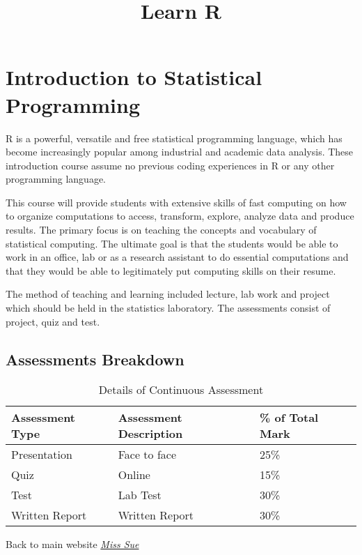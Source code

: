 \documentclass[
]{article}
\title{Learn R}
\author{}
\date{\vspace{-2.5em}}
\begin{document}
\maketitle

\section{\texorpdfstring{\textbf{Introduction to Statistical
Programming}}{Introduction to Statistical Programming}}\label{introduction-to-statistical-programming}

R is a powerful, versatile and free statistical programming language,
which has become increasingly popular among industrial and academic data
analysis. These introduction course assume no previous coding
experiences in R or any other programming language.

This course will provide students with extensive skills of fast
computing on how to organize computations to access, transform, explore,
analyze data and produce results. The primary focus is on teaching the
concepts and vocabulary of statistical computing. The ultimate goal is
that the students would be able to work in an office, lab or as a
research assistant to do essential computations and that they would be
able to legitimately put computing skills on their resume.

The method of teaching and learning included lecture, lab work and
project which should be held in the statistics laboratory. The
assessments consist of project, quiz and test.

\subsection{Assessments Breakdown}\label{assessments-breakdown}

\begin{longtable}[t]{lll}
\caption{\label{tab:unnamed-chunk-1}Details of Continuous Assessment}\\
\toprule
Assessment Type & Assessment Description & \% of Total Mark\\
\midrule
Presentation & Face to face & 25\%\\
Quiz & Online & 15\%\\
Test & Lab Test & 30\%\\
Written Report & Written Report & 30\%\\
\bottomrule
\end{longtable}

Back to main website
\href{https://sites.google.com/view/suriyatiujang/home?authuser=0}{\emph{Miss
Sue}}
\end{document}

